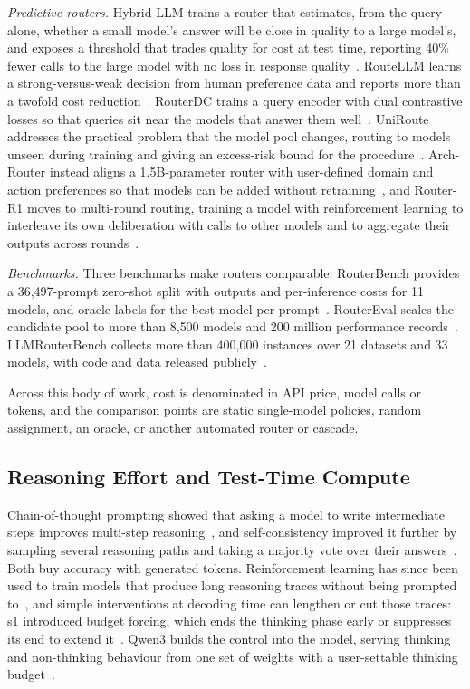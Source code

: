 \emph{Predictive routers.} Hybrid LLM trains a router that estimates, from
the query alone, whether a small model's answer will be close in quality to
a large model's, and exposes a threshold that trades quality for cost at
test time, reporting 40\% fewer calls to the large model with no loss in
response quality~\cite{ding2024hybridllm}. RouteLLM learns a
strong-versus-weak decision from human preference data and reports more than
a twofold cost reduction~\cite{ong2024routellm}. RouterDC trains a query
encoder with dual contrastive losses so that queries sit near the models
that answer them well~\cite{chen2024routerdc}. UniRoute addresses the
practical problem that the model pool changes, routing to models unseen
during training and giving an excess-risk bound for the
procedure~\cite{jitkrittum2025universal}. Arch-Router instead aligns a
1.5B-parameter router with user-defined domain and action preferences so
that models can be added without retraining~\cite{tran2025archrouter}, and
Router-R1 moves to multi-round routing, training a model with reinforcement
learning to interleave its own deliberation with calls to other models and
to aggregate their outputs across rounds~\cite{zhang2025routerr1}.

\emph{Benchmarks.} Three benchmarks make routers comparable. RouterBench
provides a 36{,}497-prompt zero-shot split with outputs and per-inference
costs for 11 models, and oracle labels for the best model per
prompt~\cite{hu2024routerbench}. RouterEval scales the candidate pool to
more than 8{,}500 models and 200 million performance
records~\cite{huang2025routereval}. LLMRouterBench collects more than
400{,}000 instances over 21 datasets and 33 models, with code and data
released publicly~\cite{li2026llmrouterbench}.

Across this body of work, cost is denominated in API price, model calls or
tokens, and the comparison points are static single-model policies, random
assignment, an oracle, or another automated router or cascade.

\subsection{Reasoning Effort and Test-Time Compute}
\label{sec:lit-reasoning}

Chain-of-thought prompting showed that asking a model to write intermediate
steps improves multi-step reasoning~\cite{wei2022cot}, and self-consistency
improved it further by sampling several reasoning paths and taking a
majority vote over their answers~\cite{wang2023selfconsistency}. Both buy
accuracy with generated tokens. Reinforcement learning has since been used
to train models that produce long reasoning traces without being
prompted to~\cite{deepseek2025r1}, and simple interventions at decoding time
can lengthen or cut those traces: s1 introduced budget forcing, which ends
the thinking phase early or suppresses its end to extend
it~\cite{muennighoff2025s1}. Qwen3 builds the control into the model,
serving thinking and non-thinking behaviour from one set of weights with a
user-settable thinking budget~\cite{qwen3}.

